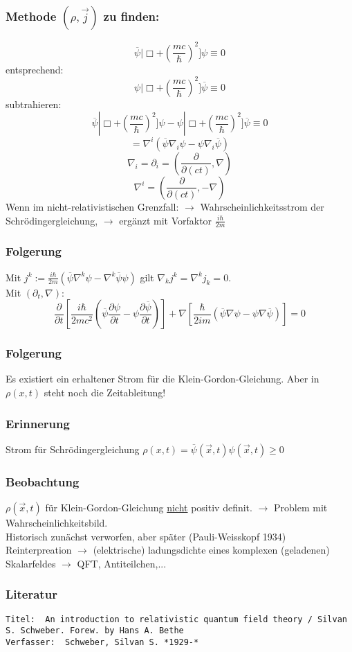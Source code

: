 \documentclass[twoside,a4paper]{scrartcl}
\renewcommand{\1}{\mathds{1}}
\newcommand{\ra}{\rightarrow}
\begin{document}
\subsubsection*{Methode $(\rho,\vec j)$ zu finden:}
$$\overline{\psi}|\Box+(\frac{mc}{\hbar})^2]\psi\equiv0$$
entsprechend:
$${\psi}|\Box+(\frac{mc}{\hbar})^2]\overline{\psi}\equiv0$$
subtrahieren:
$$\overline{\psi}|\Box+(\frac{mc}{\hbar})^2]\psi-{\psi}|\Box+(\frac{mc}{\hbar})^2]\overline{\psi}\equiv 0$$
$$=\nabla^i(\overline{\psi}\nabla_i \psi-\psi\nabla_i \overline{\psi})$$
$$\nabla_i=\partial_i=(\frac{\partial}{\partial (ct)},\nabla)$$
$$\nabla^i=(\frac{\partial}{\partial (ct)},-\nabla)$$
Wenn im nicht-relativistischen Grenzfall: $\ra$ Wahrscheinlichkeitsstrom der Schrödingergleichung, $\ra$ ergänzt mit Vorfaktor $\frac{i\hbar}{2m}$
\subsubsection*{Folgerung}
Mit $j^k:=\frac{i\hbar}{2m}(\overline{\psi}\nabla^k\psi-\nabla^k \overline{\psi} \psi)$ gilt $\nabla_k j^k=\nabla^kj_k=0$.\\
Mit $(\partial_t,\nabla)$:
$$\frac{\partial}{\partial t}[\frac{i\hbar}{2mc^2}(\overline{\psi}\frac{\partial \psi}{\partial t}-\psi \frac{\partial \overline{\psi}}{\partial t})]+\nabla[\frac{\hbar}{2im}(\overline{\psi}\nabla \psi-\psi\nabla \overline{\psi})]=0$$
\subsubsection*{Folgerung}
Es existiert ein erhaltener Strom für die Klein-Gordon-Gleichung. Aber in $\rho(x,t)$ steht noch die Zeitableitung!
\subsubsection*{Erinnerung}
Strom für Schrödingergleichung $\rho(x,t)=\overline{\psi}(\vec x,t) \psi(\vec x,t)\geq 0$
\subsubsection*{Beobachtung}
$\rho(\vec x,t)$ für Klein-Gordon-Gleichung \underline{nicht} positiv definit. $\ra$ Problem mit Wahrscheinlichkeitsbild.\\
Historisch zunächst verworfen, aber später (Pauli-Weisskopf 1934) Reinterpreation $\ra$ (elektrische) ladungsdichte eines komplexen (geladenen) Skalarfeldes $\ra$ QFT, Antiteilchen,...
\subsubsection*{Literatur}
\begin{tiny}
\begin{verbatim}
Titel: 	An introduction to relativistic quantum field theory / Silvan S. Schweber. Forew. by Hans A. Bethe
Verfasser: 	Schweber, Silvan S. *1929-*
\end{verbatim}
\end{tiny}
\end{document}
